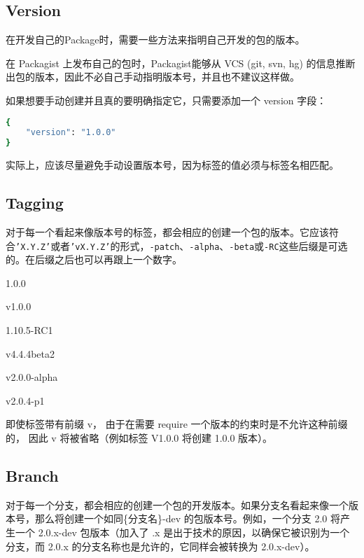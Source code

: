 \subsection{Version}


在开发自己的Package时，需要一些方法来指明自己开发的包的版本。

在 Packagist 上发布自己的包时，Packagist能够从 VCS (git, svn, hg) 的信息推断出包的版本，因此不必自己手动指明版本号，并且也不建议这样做。

如果想要手动创建并且真的要明确指定它，只需要添加一个 version 字段：

\begin{lstlisting}[language=bash]
{
    "version": "1.0.0"
}
\end{lstlisting}

实际上，应该尽量避免手动设置版本号，因为标签的值必须与标签名相匹配。


\subsection{Tagging}


对于每一个看起来像版本号的标签，都会相应的创建一个包的版本。它应该符合\texttt{'X.Y.Z'}或者\texttt{'vX.Y.Z'}的形式，\texttt{-patch}、\texttt{-alpha}、\texttt{-beta}或\texttt{-RC}这些后缀是可选的。在后缀之后也可以再跟上一个数字。

\begin{compactitem}
\item 1.0.0
\item v1.0.0
\item 1.10.5-RC1
\item v4.4.4beta2
\item v2.0.0-alpha
\item v2.0.4-p1
\end{compactitem}

即使标签带有前缀 v， 由于在需要 require 一个版本的约束时是不允许这种前缀的， 因此 v 将被省略（例如标签 V1.0.0 将创建 1.0.0 版本）。

\subsection{Branch}


对于每一个分支，都会相应的创建一个包的开发版本。如果分支名看起来像一个版本号，那么将创建一个如同\{分支名\}-dev 的包版本号。例如，一个分支 2.0 将产生一个 2.0.x-dev 包版本（加入了 .x 是出于技术的原因，以确保它被识别为一个分支，而 2.0.x 的分支名称也是允许的，它同样会被转换为 2.0.x-dev）。


